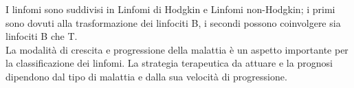 I linfomi sono suddivisi in Linfomi di Hodgkin e Linfomi non-Hodgkin; 
i primi sono dovuti alla trasformazione dei linfociti B, i secondi possono coinvolgere sia linfociti B che T.\\ 
La modalità di crescita e progressione della malattia è un aspetto importante per la classificazione dei linfomi.
La strategia terapeutica da attuare e la prognosi dipendono dal tipo di malattia e dalla sua velocità di 
progressione\cite{LINFOMIAIL}.\\





